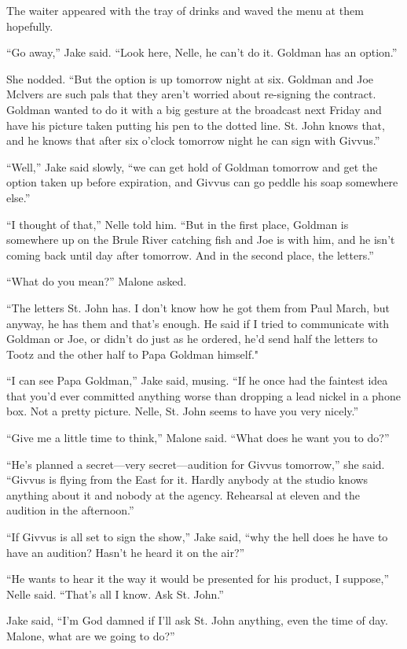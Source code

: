 \documentclass{novel}
\begin{document}
The waiter appeared with the tray of drinks and waved the menu at them hopefully.

“Go away,” Jake said. “Look here, Nelle, he can’t do it. Goldman has an option.”

She nodded. “But the option is up tomorrow night at six. Goldman and Joe Mclvers are such pals that they aren’t worried about re-signing the contract. Goldman wanted to do it with a big gesture at the broadcast next Friday and have his picture taken putting his pen to the dotted line. St. John knows that, and he knows that after six o’clock tomorrow night he can sign with Givvus.”

“Well,” Jake said slowly, “we can get hold of Goldman tomorrow and get the option taken up before expiration, and Givvus can go peddle his soap somewhere else.”

“I thought of that,” Nelle told him. “But in the first place, Goldman is somewhere up on the Brule River catching fish and Joe is with him, and he isn’t coming back until day after tomorrow. And in the second place, the letters.”

“What do you mean?” Malone asked.

“The letters St. John has. I don’t know how he got them from Paul March, but anyway, he has them and that’s enough. He said if I tried to communicate with Goldman or Joe, or didn’t do just as he ordered, he’d send half the letters to Tootz and the other half to Papa Goldman himself."

“I can see Papa Goldman,” Jake said, musing. “If he once had the faintest idea that you’d ever committed anything worse than dropping a lead nickel in a phone box. Not a pretty picture. Nelle, St. John seems to have you very nicely.”

“Give me a little time to think,” Malone said. “What does he want you to do?”

“He’s planned a secret—very secret—audition for Givvus tomorrow,” she said. “Givvus is flying from the East for it. Hardly anybody at the studio knows anything about it and nobody at the agency. Rehearsal at eleven and the audition in the afternoon.”

“If Givvus is all set to sign the show,” Jake said, “why the hell does he have to have an audition? Hasn’t he heard it on the air?”

“He wants to hear it the way it would be presented for his product, I suppose,” Nelle said. “That’s all I know. Ask St. John.”

Jake said, “I’m God damned if I'll ask St. John anything, even the time of day. Malone, what are we going to do?”
\end{document}
